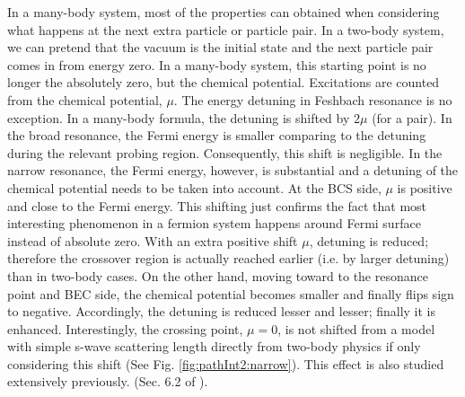 \begin{unsure}
In a many-body system, most of the properties can obtained when considering what happens at the next extra particle or particle pair. In a two-body system,  we can pretend that the vacuum is the initial state and the next particle pair comes in from energy zero.  In a many-body system, this starting point is no longer the absolutely zero, but the chemical potential.  Excitations are counted from the chemical potential, $\mu$.  The energy detuning in Feshbach resonance is no exception.  In a many-body formula, the detuning is shifted by $2\mu$ (for a pair).  In the broad resonance, the Fermi energy is smaller comparing to the detuning during the relevant probing region.  Consequently, this shift is negligible.  In the narrow resonance, the Fermi energy, however, is substantial and a detuning of the chemical potential needs to be taken into account.  At the BCS side, $\mu$ is positive and close to the Fermi energy. This shifting just confirms the fact that most interesting phenomenon in a fermion system happens around Fermi surface instead of absolute zero.  With an extra positive shift $\mu$, detuning is reduced; therefore the crossover region is actually reached earlier (i.e. by larger detuning) than in two-body cases.  On the other hand, moving toward to the resonance point and BEC side, the chemical potential becomes smaller and finally flips sign to negative. Accordingly, the detuning is reduced lesser and lesser;  finally it is enhanced.  
Interestingly, the crossing point, $\mu=0$, is not shifted from a model with simple  s-wave scattering length directly from two-body physics if only considering this shift  (See Fig. \ref{fig:pathInt2:narrow}). This effect is also  studied extensively previously. (Sec. 6.2 of \cite{GurarieNarrow}). 




\end{unsure}
